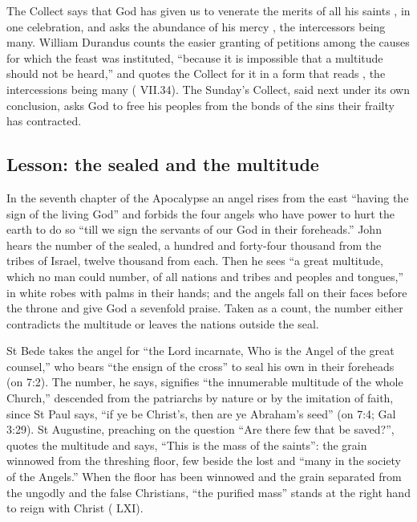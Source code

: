 The Collect says that God has given us to venerate the merits of all his
saints , in one celebration, and asks the abundance
of his mercy , the intercessors being
many. William Durandus counts the easier granting of petitions among the causes for which the feast
was instituted, ``because it is impossible that a multitude should not be
heard,'' and quotes the Collect for it in a form that reads
, the intercessions being many (
VII.34). The Sunday's Collect, said next under
its own conclusion, asks God to free his peoples from the bonds of the sins
their frailty has contracted.

\subsection{Lesson: the sealed and the multitude}

In the seventh chapter of the Apocalypse an angel rises from the east
``having the sign of the living God'' and forbids the four angels who have
power to hurt the earth to do so ``till we sign the servants of our God in
their foreheads.'' John hears the number of the sealed, a hundred and
forty-four thousand from the tribes of Israel, twelve thousand from each. Then
he sees ``a great multitude, which no man could number, of all nations and
tribes and peoples and tongues,'' in white robes with palms in their hands; and the angels fall on their faces before the
throne and give God a sevenfold praise. Taken as a count, the number either
contradicts the multitude or leaves the nations outside the seal.

St Bede takes the angel for ``the Lord incarnate, Who is the Angel of the
great counsel,'' who bears ``the ensign of the cross'' to seal his own in
their foreheads (on 7:2). The number, he says,
signifies ``the innumerable multitude of the whole Church,'' descended from the
patriarchs by nature or by the imitation of faith, since St Paul says, ``if ye
be Christ's, then are ye Abraham's seed'' (on 7:4; Gal 3:29). St Augustine, preaching on the
question ``Are there few that be saved?'', quotes the multitude and says,
``This is the mass of the saints'': the grain winnowed from the threshing
floor, few beside the lost and ``many in the society of the Angels.'' When the floor has
been winnowed and the grain separated from the ungodly and the false
Christians, ``the purified mass'' stands at the right hand to reign with Christ
( LXI).

